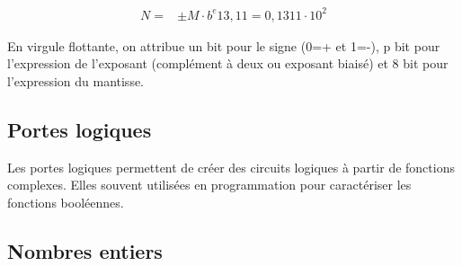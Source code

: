 \documentclass[a4paper, 11pt, twoside, fleqn]{memoir}
\begin{document}
\begin{align*}
N =& \pm M \cdot b^{e}
13,11=0,1311 \cdot 10^2
\end{align*}

En virgule flottante, on attribue un bit pour le signe (0=+ et 1=-), p bit pour l'expression de l'exposant (complément à deux ou exposant biaisé) et 8 bit pour l'expression du mantisse.

\subsection{Portes logiques}

Les portes logiques permettent de créer des circuits logiques à partir de fonctions complexes. Elles souvent utilisées en programmation pour caractériser les fonctions booléennes. 



\subsection{Nombres entiers}


	
\end{document}
